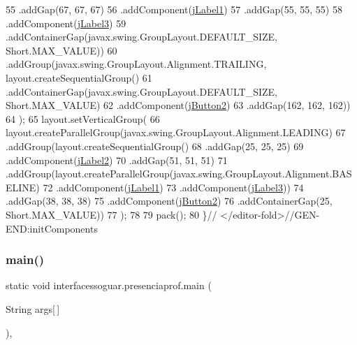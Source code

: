 \begin{DoxyCode}
55                 .addGap(67, 67, 67)
56                 .addComponent(\mbox{\hyperlink{classinterfacessoguar_1_1presenciaprof_ad2eecc0bf28ea2305d1008b07e796236}{jLabel1}})
57                 .addGap(55, 55, 55)
58                 .addComponent(\mbox{\hyperlink{classinterfacessoguar_1_1presenciaprof_a4f3e97efdda0f378c637202970533e22}{jLabel3}})
59                 .addContainerGap(javax.swing.GroupLayout.DEFAULT\_SIZE, Short.MAX\_VALUE))
60             .addGroup(javax.swing.GroupLayout.Alignment.TRAILING, layout.createSequentialGroup()
61                 .addContainerGap(javax.swing.GroupLayout.DEFAULT\_SIZE, Short.MAX\_VALUE)
62                 .addComponent(\mbox{\hyperlink{classinterfacessoguar_1_1presenciaprof_a18f5bfde2ab11a4dc2cbf168d7d12cfd}{jButton2}})
63                 .addGap(162, 162, 162))
64         );
65         layout.setVerticalGroup(
66             layout.createParallelGroup(javax.swing.GroupLayout.Alignment.LEADING)
67             .addGroup(layout.createSequentialGroup()
68                 .addGap(25, 25, 25)
69                 .addComponent(\mbox{\hyperlink{classinterfacessoguar_1_1presenciaprof_a48151227c574caee1cc79ec5af3ec825}{jLabel2}})
70                 .addGap(51, 51, 51)
71                 .addGroup(layout.createParallelGroup(javax.swing.GroupLayout.Alignment.BASELINE)
72                     .addComponent(\mbox{\hyperlink{classinterfacessoguar_1_1presenciaprof_ad2eecc0bf28ea2305d1008b07e796236}{jLabel1}})
73                     .addComponent(\mbox{\hyperlink{classinterfacessoguar_1_1presenciaprof_a4f3e97efdda0f378c637202970533e22}{jLabel3}}))
74                 .addGap(38, 38, 38)
75                 .addComponent(\mbox{\hyperlink{classinterfacessoguar_1_1presenciaprof_a18f5bfde2ab11a4dc2cbf168d7d12cfd}{jButton2}})
76                 .addContainerGap(25, Short.MAX\_VALUE))
77         );
78 
79         pack();
80     \}\textcolor{comment}{// </editor-fold>//GEN-END:initComponents}
\end{DoxyCode}
\mbox{\label{classinterfacessoguar_1_1presenciaprof_ae0e3372322cf15d74092300caff9b031}} 
\subsubsection{\texorpdfstring{main()}{main()}}
{\footnotesize\ttfamily static void interfacessoguar.\+presenciaprof.\+main (\begin{DoxyParamCaption}\item[{String}]{args\mbox{[}$\,$\mbox{]} }\end{DoxyParamCaption})\hspace{0.3cm}{\ttfamily [inline]}, {\ttfamily [static]}}


